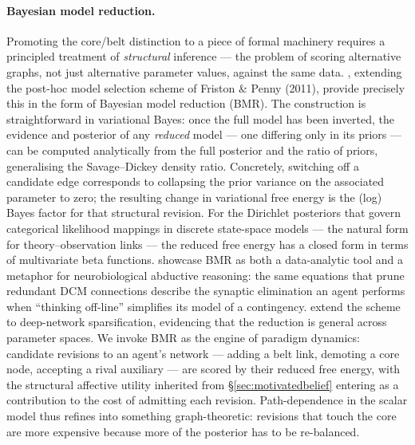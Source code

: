 \paragraph{Bayesian model reduction.}
Promoting the core/belt distinction to a piece of formal machinery
requires a principled treatment of \emph{structural} inference --- the
problem of scoring alternative graphs, not just alternative parameter
values, against the same data. \citet{Friston2018_2}, extending the
post-hoc model selection scheme of Friston \& Penny (2011), provide
precisely this in the form of Bayesian model reduction (BMR). The
construction is straightforward in variational Bayes: once the full
model has been inverted, the evidence and posterior of any
\emph{reduced} model --- one differing only in its priors --- can be
computed analytically from the full posterior and the ratio of priors,
generalising the Savage--Dickey density ratio. Concretely, switching
off a candidate edge corresponds to collapsing the prior variance on
the associated parameter to zero; the resulting change in variational
free energy is the (log) Bayes factor for that structural revision.
For the Dirichlet posteriors that govern categorical likelihood
mappings in discrete state-space models --- the natural form for
theory--observation links --- the reduced free energy has a closed
form in terms of multivariate beta functions. \citet{Friston2018_2}
showcase BMR as both a data-analytic tool and a metaphor for
neurobiological abductive reasoning: the same equations that prune
redundant DCM connections describe the synaptic elimination an agent
performs when ``thinking off-line'' simplifies its model of a
contingency. \citet{Markovi'c2023_1} extend the scheme to deep-network
sparsification, evidencing that the reduction is general across
parameter spaces. We invoke BMR as the engine of paradigm dynamics:
candidate revisions to an agent's network --- adding a belt link,
demoting a core node, accepting a rival auxiliary --- are scored by
their reduced free energy, with the structural affective utility
inherited from \S\ref{sec:motivatedbelief} entering as a contribution
to the cost of admitting each revision. Path-dependence in the scalar
model thus refines into something graph-theoretic: revisions that
touch the core are more expensive because more of the posterior has
to be re-balanced.

